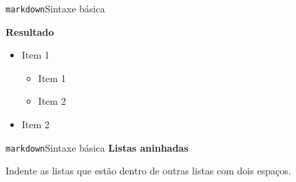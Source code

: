 \documentclass[
  10pt,
  ignorenonframetext,
]{beamer}
\providecommand{\tightlist}{%
  \setlength{\itemsep}{0pt}\setlength{\parskip}{0pt}}\usepackage{longtable,booktabs,array}
\begin{document}
\begin{frame}[fragile]{\texttt{markdown}\newline Sintaxe básica}
\normalsize

\textbf{Resultado}

\begin{itemize}
\tightlist
\item
  Item 1

  \begin{itemize}
  \tightlist
  \item
    Item 1
  \item
    Item 2
  \end{itemize}
\item
  Item 2
\end{itemize}
\end{frame}

\begin{frame}[fragile]{\texttt{markdown}\newline Sintaxe básica}
\protect\hypertarget{markdownsintaxe-buxe1sica-10}{}
\textbf{Listas aninhadas}

Indente as listas que estão dentro de outras listas com dois espaços.

\scriptsize


\end{frame}
\end{document}

